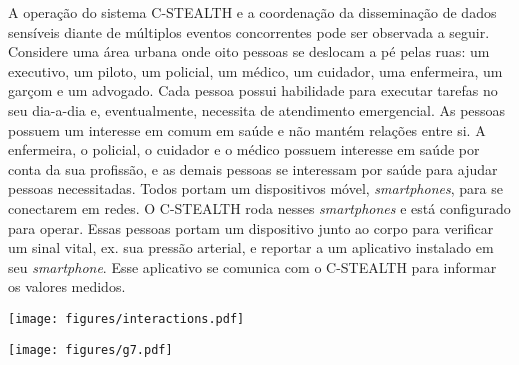 \documentclass[12pt]{article}
\begin{document}
A
operação do sistema \mbox{C-STEALTH} e
a coordenação da disseminação de dados sensíveis diante de múltiplos eventos concorrentes pode ser observada a seguir. Considere uma área urbana onde oito pessoas se deslocam a pé pelas ruas: um executivo, um piloto, um policial, um médico, um cuidador, uma enfermeira, um garçom e um advogado. Cada pessoa possui habilidade para executar
tarefas no seu dia-a-dia e, eventualmente,
necessita
de atendimento emergencial.
As pessoas
possuem um interesse em comum em saúde e não mantém relações entre si. A enfermeira, o policial, o cuidador e o médico possuem interesse em saúde por conta da sua profissão, e as demais pessoas se interessam por saúde para ajudar pessoas necessitadas. Todos portam um dispositivos móvel, \textit{smartphones}, para se conectarem em redes. O \mbox{C-STEALTH} roda nesses \textit{smartphones} e está configurado para operar. Essas pessoas %
portam um dispositivo junto ao corpo para verificar um sinal vital, ex. sua pressão arterial, %
e reportar a um aplicativo instalado em seu \textit{smartphone}. Esse aplicativo se comunica com o \mbox{C-STEALTH} para informar os valores medidos.


\begin{table}[H]
	\begin{minipage}[b]{0.5\linewidth}
		\texttt{[image: figures/interactions.pdf]}
		\label{fig:interacoesnotempo}
	\end{minipage}
	\begin{minipage}[b]{0.5\linewidth}
		\centering
		\texttt{[image: figures/g7.pdf]}
		\vspace{-0.2cm}
	    \label{fig:grafo6}
	\end{minipage}\hfill
\end{table}

\vspace{-0.5cm}
\end{document}
